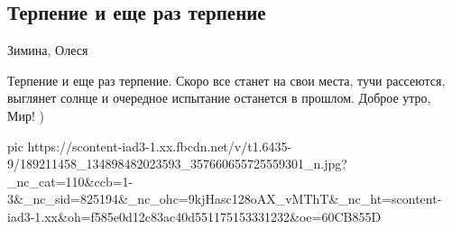  
 
 
 
 
\subsection{Терпение и еще раз терпение}
\label{sec:20_05_2021.fb.respublikalnr.1.terpenie_mir}

Зимина, Олеся

Терпение и еще раз терпение. Скоро все станет на свои места, тучи рассеются,
выглянет солнце и очередное испытание останется в прошлом.  Доброе утро, Мир! )

\ifcmt
  pic https://scontent-iad3-1.xx.fbcdn.net/v/t1.6435-9/189211458_134898482023593_357660655725559301_n.jpg?_nc_cat=110&ccb=1-3&_nc_sid=825194&_nc_ohc=9kjHasc128oAX_vMThT&_nc_ht=scontent-iad3-1.xx&oh=f585e0d12c83ac40d551175153331232&oe=60CB855D
\fi

